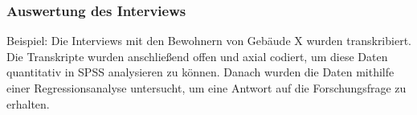 \subsubsection{Auswertung des Interviews}

Beispiel:
Die Interviews mit den Bewohnern von Gebäude X wurden transkribiert. Die Transkripte wurden anschließend offen und axial codiert, um diese Daten quantitativ in SPSS analysieren zu können. Danach wurden die Daten mithilfe einer Regressionsanalyse untersucht, um eine Antwort auf die Forschungsfrage zu erhalten.